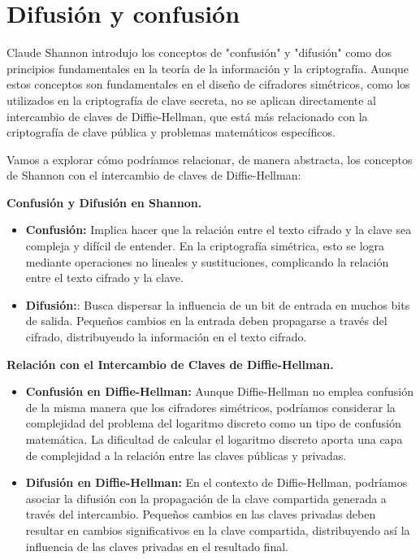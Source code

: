 \documentclass[11pt]{article}
\begin{document}
\section{Difusión y confusión}

Claude Shannon introdujo los conceptos de "confusión" y "difusión" como dos principios fundamentales en la teoría de la información y la criptografía. Aunque estos conceptos son fundamentales en el diseño de cifradores simétricos, como los utilizados en la criptografía de clave secreta, no se aplican directamente al intercambio de claves de Diffie-Hellman, que está más relacionado con la criptografía de clave pública y problemas matemáticos específicos.

Vamos a explorar cómo podríamos relacionar, de manera abstracta, los conceptos de Shannon con el intercambio de claves de Diffie-Hellman:

\textbf{Confusión y Difusión en Shannon.}

\begin{itemize}
	\item \textbf{Confusión:} Implica hacer que la relación entre el texto cifrado y la clave sea compleja y difícil de entender. En la criptografía simétrica, esto se logra mediante operaciones no lineales y sustituciones, complicando la relación entre el texto cifrado y la clave.

	\item \textbf{Difusión:}: Busca dispersar la influencia de un bit de entrada en muchos bits de salida. Pequeños cambios en la entrada deben propagarse a través del cifrado, distribuyendo la información en el texto cifrado.
\end{itemize}

\textbf{Relación con el Intercambio de Claves de Diffie-Hellman.}

\begin{itemize}
    \item \textbf{Confusión en Diffie-Hellman:}  Aunque Diffie-Hellman no emplea confusión de la misma manera que los cifradores simétricos, podríamos considerar la complejidad del problema del logaritmo discreto como un tipo de confusión matemática. La dificultad de calcular el logaritmo discreto aporta una capa de complejidad a la relación entre las claves públicas y privadas.
    
    \item \textbf{Difusión en Diffie-Hellman:} En el contexto de Diffie-Hellman, podríamos asociar la difusión con la propagación de la clave compartida generada a través del intercambio. Pequeños cambios en las claves privadas deben resultar en cambios significativos en la clave compartida, distribuyendo así la influencia de las claves privadas en el resultado final.
\end{itemize}
\end{document}
